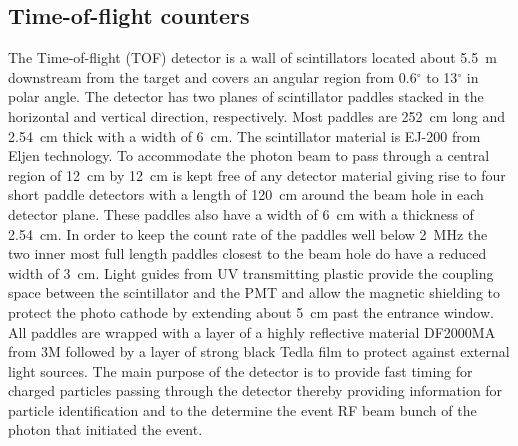 \subsection[Time-of-flight counters (Beni)]{Time-of-flight counters \label{sec:tof}}
The Time-of-flight (TOF) detector is a wall of scintillators located about 5.5~m downstream from the target and covers 
an angular region from 0.6$^{\circ}$ to 13$^{\circ}$ in polar angle. The detector has two planes of
scintillator paddles stacked in the horizontal and vertical direction, respectively. Most paddles are 252~cm long and 2.54~cm
thick with a width of 6~cm. 
The scintillator material is EJ-200 from Eljen technology.
To accommodate the photon beam to pass through a central region of 12~cm by 12~cm is kept
free of any detector material giving rise to four short paddle detectors with a length of 120~cm around the beam hole
in each detector plane. These paddles also have a width of 6~cm with a thickness of 2.54~cm. In order to keep the
count rate of the paddles well below 2~MHz the two inner most full length paddles closest to the beam hole do have a reduced width of 3~cm.
Light guides from UV transmitting plastic provide the coupling space between the scintillator and the PMT and allow the 
magnetic shielding to protect the photo cathode by extending about 5~cm past the entrance window. All paddles are wrapped
with a layer of a highly reflective material DF2000MA from 3M followed by a layer of strong black Tedla film to
protect against external light sources. 
The main purpose of the detector is to provide fast timing for charged particles passing through the detector thereby providing information for particle identification and to the determine the event RF beam bunch of the photon that initiated the event.

